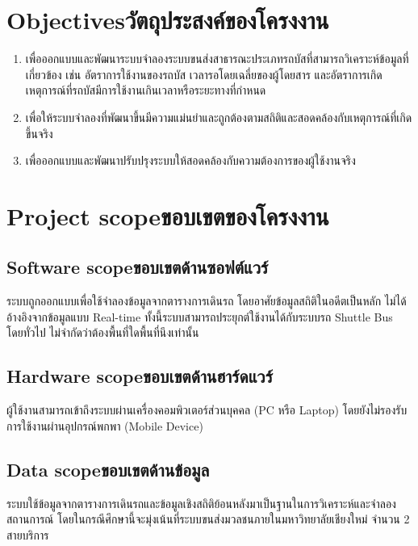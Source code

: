 \section{\ifenglish Objectives\else วัตถุประสงค์ของโครงงาน\fi}
\begin{enumerate}
    \item เพื่อออกแบบและพัฒนาระบบจำลองระบบขนส่งสาธารณะประเภทรถบัสที่สามารถวิเคราะห์ข้อมูลที่เกี่ยวข้อง เช่น อัตราการใช้งานของรถบัส เวลารอโดยเฉลี่ยของผู้โดยสาร และอัตราการเกิดเหตุการณ์ที่รถบัสมีการใช้งานเกินเวลาหรือระยะทางที่กำหนด
    \item เพื่อให้ระบบจำลองที่พัฒนาขึ้นมีความแม่นยำและถูกต้องตามสถิติและสอดคล้องกับเหตุการณ์ที่เกิดขึ้นจริง 
    \item เพื่อออกแบบและพัฒนาปรับปรุงระบบให้สอดคล้องกับความต้องการของผู้ใช้งานจริง
\end{enumerate}

\section{\ifenglish Project scope\else ขอบเขตของโครงงาน\fi}

\subsection{\ifenglish Software scope\else ขอบเขตด้านซอฟต์แวร์\fi}
    \begin{mypara}
        \indent ระบบถูกออกแบบเพื่อใช้จำลองข้อมูลจากตารางการเดินรถ โดยอาศัยข้อมูลสถิติในอดีตเป็นหลัก 
        ไม่ได้อ้างอิงจากข้อมูลแบบ Real-time ทั้งนี้ระบบสามารถประยุกต์ใช้งานได้กับระบบรถ 
        Shuttle Bus โดยทั่วไป ไม่จำกัดว่าต้องพื้นที่ใดพื้นที่นึงเท่านั้น
    \end{mypara}
\subsection{\ifenglish Hardware scope\else ขอบเขตด้านฮาร์ดแวร์\fi}
    \begin{mypara}
        \indent ผู้ใช้งานสามารถเข้าถึงระบบผ่านเครื่องคอมพิวเตอร์ส่วนบุคคล (PC หรือ Laptop)
         โดยยังไม่รองรับการใช้งานผ่านอุปกรณ์พกพา (Mobile Device)
    \end{mypara}
\subsection{\ifenglish Data scope\else ขอบเขตด้านข้อมูล\fi}
    \begin{mypara}
        \indent ระบบใช้ข้อมูลจากตารางการเดินรถและข้อมูลเชิงสถิติย้อนหลังมาเป็นฐานในการวิเคราะห์และจำลองสถานการณ์ 
        โดยในกรณีศึกษานี้จะมุ่งเน้นที่ระบบขนส่งมวลชนภายในมหาวิทยาลัยเชียงใหม่ จำนวน 2 สายบริการ
    \end{mypara}
